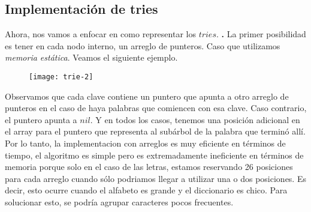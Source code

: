 \documentclass[10pt,a4paper]{article}
\begin{document}
\subsection{Implementación de tries}

Ahora, nos vamos a enfocar en como representar los $tries$.
\newline
\newline
\textbf{.} La primer posibilidad es tener en cada nodo interno, un arreglo de punteros. Caso que utilizamos \textit{memoria estática}. Veamos el siguiente ejemplo.

\begin{figure}[h]
	\centering
\texttt{[image: trie-2]}
	\label{drivers1}
\end{figure}

Observamos que cada clave contiene un puntero que apunta a otro arreglo de punteros en el caso de haya palabras que comiencen con esa clave. Caso contrario, el puntero apunta a $nil$. Y en todos los casos, tenemos una posición adicional en el array para el puntero que representa al subárbol de la palabra que terminó allí.
\newline
\newline
Por lo tanto, la implementacion con arreglos es muy eficiente en términos de tiempo, el algoritmo es simple pero es extremadamente ineficiente en términos de memoria porque solo en el caso de las letras, estamos reservando 26 posiciones para cada arreglo cuando sólo podriamos llegar a utilizar una o dos posiciones. Es decir, esto ocurre cuando el alfabeto es grande y el diccionario es chico. Para solucionar esto, se podría agrupar caracteres pocos frecuentes. 
\end{document}
